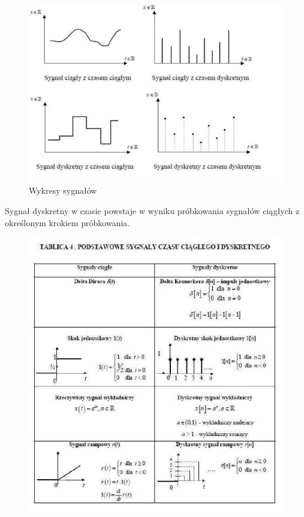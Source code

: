 \documentclass[a4paper,twoside]{report}
\begin{document}
\begin{figure}[htbp]
\centering
\includegraphics[scale=0.6]{obrazy/wykresy_sygnaly.png}
\caption{Wykresy sygnałów}
\end{figure}

Sygnał dyskretny w  czasie powstaje w wyniku próbkowania sygnałów ciągłych z określonym krokiem próbkowania.

\begin{figure}[htbp]
\centering
\includegraphics[scale=0.9]{obrazy/podstawowe_sygnaly.png}
\end{figure}
\end{document}
